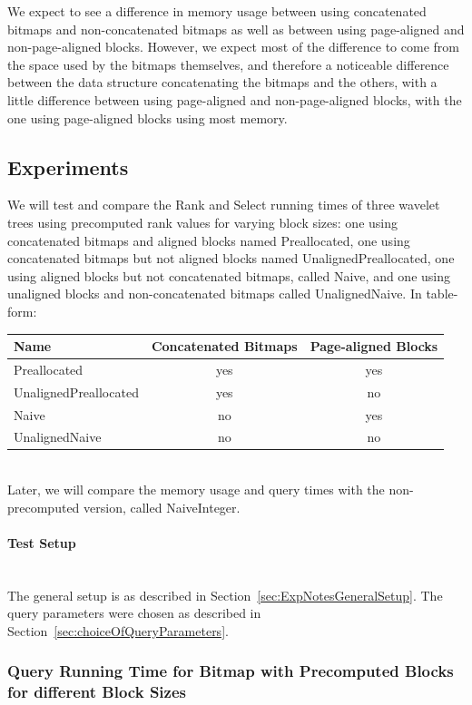 We expect to see a difference in memory usage between using concatenated bitmaps and non-concatenated bitmaps as well as between using page-aligned and non-page-aligned blocks.
However, we expect most of the difference to come from the space used by the bitmaps themselves, and therefore a noticeable difference between the data structure concatenating the bitmaps and the others, with a little difference between using page-aligned and non-page-aligned blocks, with the one using page-aligned blocks using most memory.



\subsection{Experiments}
We will test and compare the Rank and Select running times of three wavelet trees using precomputed rank values for varying block sizes: one using concatenated bitmaps and aligned blocks named Preallocated, one using concatenated bitmaps but not aligned blocks named UnalignedPreallocated, one using aligned blocks but not concatenated bitmaps, called Naive,
and one using unaligned blocks and non-concatenated bitmaps called UnalignedNaive.
In table-form:\\
\begin{tabular}{|lcc|}
\hline
Name						& Concatenated Bitmaps	& Page-aligned Blocks	\\ \hline
Preallocated				& yes					& yes					\\ \hline
UnalignedPreallocated	& yes					& no						\\ \hline
Naive					& no						& yes					\\ \hline
UnalignedNaive			& no						& no						\\ \hline
\end{tabular}\\
Later, we will compare the memory usage and query times with the non-precomputed version, called NaiveInteger.

\paragraph{Test Setup}~\\
The general setup is as described in Section~\ref{sec:ExpNotesGeneralSetup}.
The query parameters were chosen as described in Section~\ref{sec:choiceOfQueryParameters}.

\subsubsection{Query Running Time for Bitmap with Precomputed Blocks for different Block Sizes}
\label{sec:queryRunTimePrecomputedBlockSizes}

